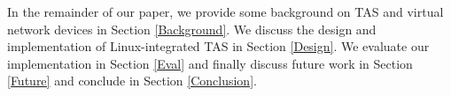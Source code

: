 In the remainder of our paper, we provide some background on TAS and virtual
network devices in Section \ref{Background}. We discuss the design and
implementation of Linux-integrated TAS in Section \ref{Design}. We evaluate
our implementation in Section \ref{Eval} and finally discuss future work in 
Section \ref{Future} and conclude in Section \ref{Conclusion}.
